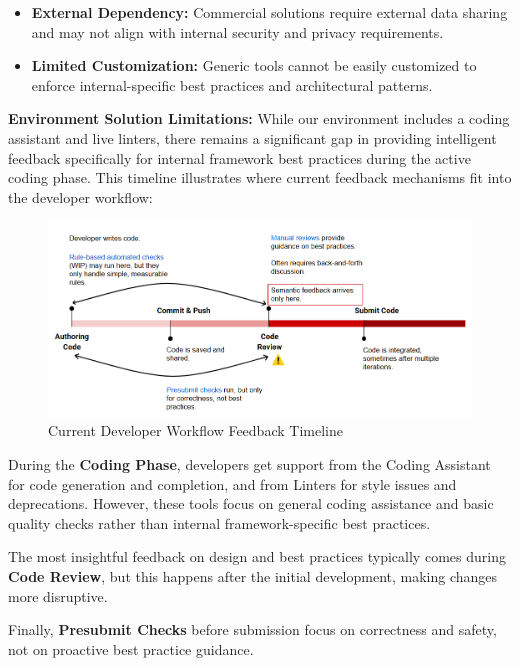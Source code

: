 \begin{spacing}{1.2}
\begin{itemize}
    \item \textbf{External Dependency:} Commercial solutions require external data sharing and may not align with internal security and privacy requirements.
    
    \item \textbf{Limited Customization:} Generic tools cannot be easily customized to enforce internal-specific best practices and architectural patterns.
\end{itemize}

\textbf{Environment Solution Limitations:}
While our environment includes a coding assistant and live linters, there remains a significant gap in providing intelligent feedback specifically for internal framework best practices during the active coding phase. This timeline illustrates where current feedback mechanisms fit into the developer workflow:

\begin{figure}[H]
    \centering
    \includegraphics[scale=0.9]{Images/developer_workflow_feedback_timeline.png}
    \caption{Current Developer Workflow Feedback Timeline}
    \label{fig:developer_workflow_feedback_timeline}
\end{figure}

During the \textbf{Coding Phase}, developers get support from the Coding Assistant for code generation and completion, and from Linters for style issues and deprecations. However, these tools focus on general coding assistance and basic quality checks rather than internal framework-specific best practices.

The most insightful feedback on design and best practices typically comes during \textbf{Code Review}, but this happens after the initial development, making changes more disruptive.

Finally, \textbf{Presubmit Checks} before submission focus on correctness and safety, not on proactive best practice guidance.


\end{spacing}
